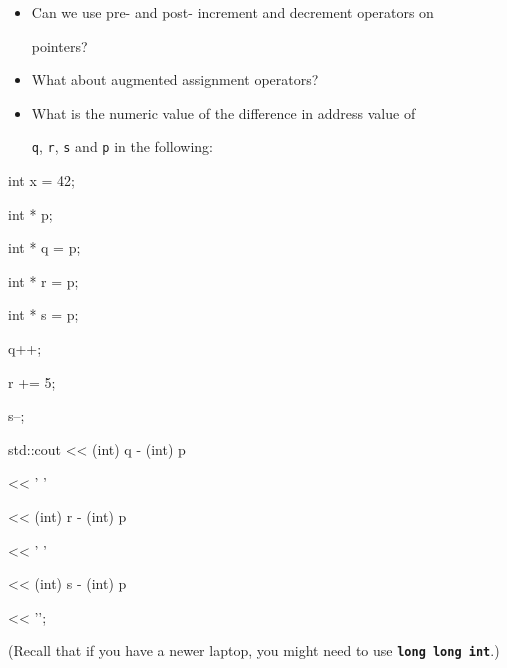 \begin{itemize}

\item Can we use pre- and post- increment and decrement operators on

  pointers?

\item What about augmented assignment operators?

\item What is the numeric value of the difference in address value of

  \texttt{q}, \texttt{r}, \texttt{s} and \texttt{p} in the following:

\end{itemize}



\begin{consolethree}[escapeinside=||]

int x = 42;

int * p;

int * q = p;

int * r = p;

int * s = p;

q++;

r += 5;

s--;

std::cout << (int) q - (int) p

          << ' '

          << (int) r - (int) p

          << ' '

          << (int) s - (int) p

          << '\n';

\end{consolethree}



(Recall that if you have a newer laptop, you might need to use \texttt{\textbf{long long int}}.)

